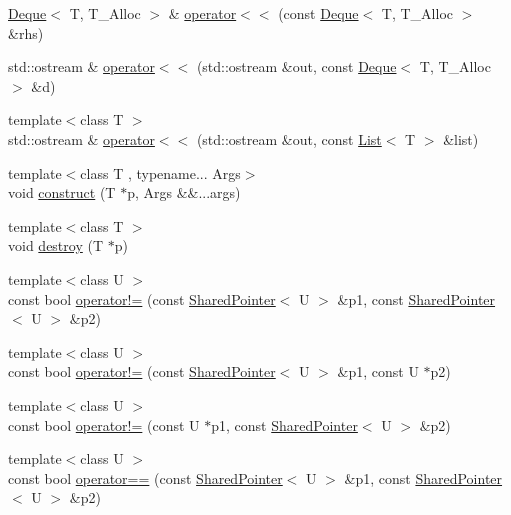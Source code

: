 \begin{DoxyCompactItemize}
\hyperlink{namespaceprism_a8e77ed12f9b3a35d81935362d3050d0c}{Deque}$<$ T, T\+\_\+\+Alloc $>$ \& \hyperlink{namespaceprism_a602c194731bf182cf114b7d297bbff51}{operator$<$$<$} (const \hyperlink{namespaceprism_a8e77ed12f9b3a35d81935362d3050d0c}{Deque}$<$ T, T\+\_\+\+Alloc $>$ \&rhs)
\item 
std\+::ostream \& \hyperlink{namespaceprism_a554e40f4cee7980e001683ea75b16cd9}{operator$<$$<$} (std\+::ostream \&out, const \hyperlink{namespaceprism_a8e77ed12f9b3a35d81935362d3050d0c}{Deque}$<$ T, T\+\_\+\+Alloc $>$ \&d)
\item 
{\footnotesize template$<$class T $>$ }\\std\+::ostream \& \hyperlink{namespaceprism_a50da64555d454821545fe0311fde6a62}{operator$<$$<$} (std\+::ostream \&out, const \hyperlink{classprism_1_1_list}{List}$<$ T $>$ \&list)
\item 
{\footnotesize template$<$class T , typename... Args$>$ }\\void \hyperlink{namespaceprism_af62c0c26668facbe5607e8915442010e}{construct} (T $\ast$p, Args \&\&...args)
\item 
{\footnotesize template$<$class T $>$ }\\void \hyperlink{namespaceprism_af889ac2726920ab1b4f5361e6563d041}{destroy} (T $\ast$p)
\item 
{\footnotesize template$<$class U $>$ }\\const bool \hyperlink{namespaceprism_a9df924e4deb059bf1200701c8235410a}{operator!=} (const \hyperlink{classprism_1_1_shared_pointer}{Shared\+Pointer}$<$ U $>$ \&p1, const \hyperlink{classprism_1_1_shared_pointer}{Shared\+Pointer}$<$ U $>$ \&p2)
\item 
{\footnotesize template$<$class U $>$ }\\const bool \hyperlink{namespaceprism_ad6391c124e006b0e3a3ec67f55e208b0}{operator!=} (const \hyperlink{classprism_1_1_shared_pointer}{Shared\+Pointer}$<$ U $>$ \&p1, const U $\ast$p2)
\item 
{\footnotesize template$<$class U $>$ }\\const bool \hyperlink{namespaceprism_ab8792dbd5cac5678390843bacdb69daa}{operator!=} (const U $\ast$p1, const \hyperlink{classprism_1_1_shared_pointer}{Shared\+Pointer}$<$ U $>$ \&p2)
\item 
{\footnotesize template$<$class U $>$ }\\const bool \hyperlink{namespaceprism_ae53d52e8a36ec7ca58ea1731cc18f1d8}{operator==} (const \hyperlink{classprism_1_1_shared_pointer}{Shared\+Pointer}$<$ U $>$ \&p1, const \hyperlink{classprism_1_1_shared_pointer}{Shared\+Pointer}$<$ U $>$ \&p2)

\end{DoxyCompactItemize}
